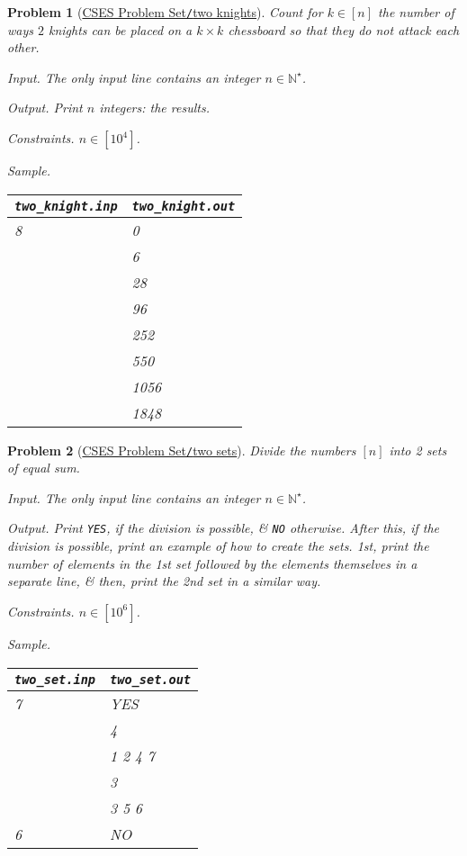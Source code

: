\documentclass{article}
\newtheorem{problem}{Problem}
\begin{document}
\begin{problem}[\href{https://cses.fi/problemset/task/1072}{CSES Problem Set{\tt/}two knights}]
    Count for $k\in[n]$ the number of ways $2$ knights can be placed on a $k\times k$ chessboard so that they do not attack each other.
    \item {\sf Input.} The only input line contains an integer $n\in\mathbb{N}^\star$.
    \item {\sf Output.} Print $n$ integers: the results.
    \item {\sf Constraints.} $n\in[10^4]$.
    \item {\sf Sample.}
    \begin{table}[H]
        \centering
        \begin{tabular}{|l|l|}
            \hline
            \verb|two_knight.inp| & \verb|two_knight.out| \\
            \hline
            8 & 0 \\
            & 6 \\
            & 28 \\
            & 96 \\
            & 252 \\
            & 550 \\
            & 1056 \\
            & 1848 \\
            \hline
        \end{tabular}
    \end{table}
\end{problem}

\begin{problem}[\href{https://cses.fi/problemset/task/1092}{CSES Problem Set{\tt/}two sets}]
    Divide the numbers $[n]$ into 2 sets of equal sum.
    \item {\sf Input.} The only input line contains an integer $n\in\mathbb{N}^\star$.
    \item {\sf Output.} Print {\tt YES}, if the division is possible, \& {\tt NO} otherwise. After this, if the division is possible, print an example of how to create the sets. 1st, print the number of elements in the 1st set followed by the elements themselves in a separate line, \& then, print the 2nd set in a similar way.
    \item {\sf Constraints.} $n\in[10^6]$.
    \item {\sf Sample.}
    \begin{table}[H]
        \centering
        \begin{tabular}{|l|l|}
            \hline
            \verb|two_set.inp| & \verb|two_set.out| \\
            \hline
            7 & YES \\
            & 4 \\
            & 1 2 4 7\\
            & 3 \\
            & 3 5 6\\
            \hline
            6 & NO
        \end{tabular}
    \end{table}
\end{problem}
\end{document}
